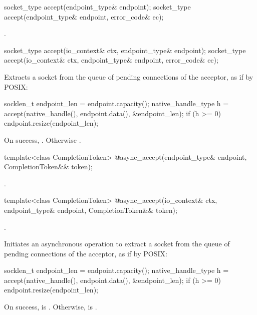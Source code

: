\begin{itemdecl}
socket_type accept(endpoint_type& endpoint);
socket_type accept(endpoint_type& endpoint, error_code& ec);
\end{itemdecl}

\begin{itemdescr}
\pnum
\returns {}.
\end{itemdescr}

\begin{itemdecl}
socket_type accept(io_context& ctx, endpoint_type& endpoint);
socket_type accept(io_context& ctx, endpoint_type& endpoint,
                   error_code& ec);
\end{itemdecl}

\begin{itemdescr}
\pnum
\effects Extracts a socket from the queue of pending connections of the acceptor, as if by POSIX: 
\begin{codeblock}
socklen_t endpoint_len = endpoint.capacity();
native_handle_type h = accept(native_handle(),
                              endpoint.data(),
                              &endpoint_len);
if (h >= 0)
  endpoint.resize(endpoint_len);
\end{codeblock}


\pnum
\returns On success, . Otherwise .
\end{itemdescr}

\begin{itemdecl}
template<class CompletionToken>
  @\DEDUCED@ async_accept(endpoint_type& endpoint,
                       CompletionToken&& token);
\end{itemdecl}

\begin{itemdescr}
\pnum
\returns {}.
\end{itemdescr}

\begin{itemdecl}
template<class CompletionToken>
  @\DEDUCED@ async_accept(io_context& ctx, endpoint_type& endpoint,
                       CompletionToken&& token);
\end{itemdecl}

\begin{itemdescr}
\pnum
\completionsig {}.

\pnum
\effects Initiates an asynchronous operation to extract a socket from the queue of pending connections of the acceptor, as if by POSIX: 
\begin{codeblock}
socklen_t endpoint_len = endpoint.capacity();
native_handle_type h = accept(native_handle(),
                              endpoint.data(),
                              &endpoint_len);
if (h >= 0)
  endpoint.resize(endpoint_len);
\end{codeblock}
On success,  is . Otherwise,   is  .
\end{itemdescr}

